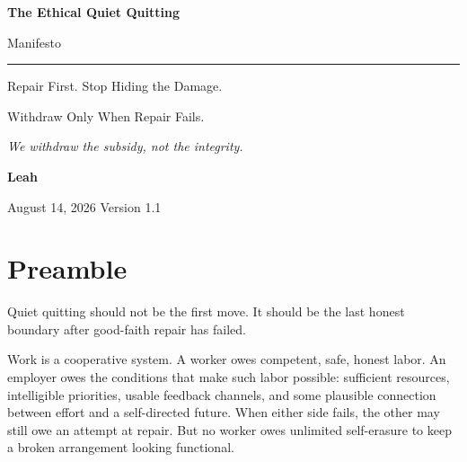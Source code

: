 \documentclass[11pt,oneside]{article}
\begin{document}
\hypersetup{pageanchor=false}

\begin{titlepage}
\thispagestyle{empty}
\vspace*{0.9in}

{\sffamily\bfseries\fontsize{31}{36}\selectfont\color{ManifestInk}
The Ethical Quiet Quitting\par
Manifesto\par}

\vspace{0.5em}
{\color{ManifestRule}\rule{\textwidth}{1.2pt}}
\vspace{1.0em}

{\sffamily\fontsize{17}{23}\selectfont\color{ManifestGray}
Repair First. Stop Hiding the Damage.\par
Withdraw Only When Repair Fails.\par}

\vfill

\begin{tcolorbox}[
  enhanced,
  colback=ManifestLight,
  colframe=ManifestRule,
  boxrule=0pt,
  leftrule=4pt,
  arc=0pt,
  left=14pt,right=14pt,top=13pt,bottom=13pt
]
{\Large\itshape We withdraw the subsidy, not the integrity.}
\end{tcolorbox}

\vfill

{\sffamily\large\bfseries Leah\par}
\vspace{0.2em}
{\sffamily\color{ManifestGray}August 14, 2026 \quad Version 1.1\par}
\vspace{0.55in}
\end{titlepage}

\thispagestyle{plain}
\tableofcontents
\clearpage
{}
\hypersetup{pageanchor=true}

\section{Preamble}\label{preamble}

Quiet quitting should not be the first move. It should be the last
honest boundary after good-faith repair has failed.

Work is a cooperative system. A worker owes competent, safe, honest
labor. An employer owes the conditions that make such labor possible:
sufficient resources, intelligible priorities, usable feedback channels,
and some plausible connection between effort and a self-directed future.
When either side fails, the other may still owe an attempt at repair.
But no worker owes unlimited self-erasure to keep a broken arrangement
looking functional.
\end{document}
